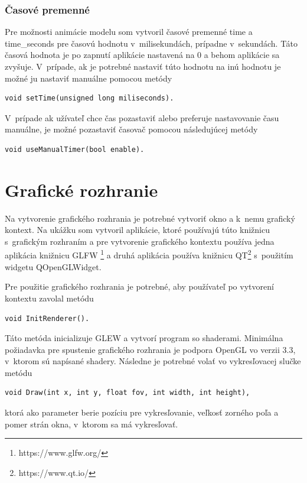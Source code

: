

\subsubsection*{Časové premenné}
Pre možnosti animácie modelu som vytvoril časové premenné time a time\_seconds pre časovú hodnotu v~milisekundách, prípadne v~sekundách. Táto časová hodnota je po zapnutí aplikácie nastavená na 0 a behom aplikácie sa zvyšuje. V~prípade, ak je potrebné nastaviť túto hodnotu na inú hodnotu je možné ju nastaviť manuálne pomocou metódy
\begin{lstlisting}
void setTime(unsigned long miliseconds).
\end{lstlisting}
V~prípade ak užívateľ chce čas pozastaviť alebo preferuje nastavovanie času manuálne, je možné pozastaviť časovač pomocou následujúcej metódy
\begin{lstlisting}
void useManualTimer(bool enable).
\end{lstlisting}

\section{Grafické rozhranie}
Na vytvorenie grafického rozhrania je potrebné vytvoriť okno a k~nemu grafický kontext. Na ukážku som vytvoril aplikácie, ktoré používajú túto knižnicu s~grafickým rozhraním a pre vytvorenie grafického kontextu používa jedna aplikácia knižnicu GLFW \footnote{https://www.glfw.org/} a druhá aplikácia používa knižnicu QT\footnote{https://www.qt.io/} s~použitím widgetu QOpenGLWidget. 

Pre použitie grafického rozhrania je potrebné, aby používateľ po vytvorení kontextu zavolal metódu 
\begin{lstlisting}
void InitRenderer().
\end{lstlisting}
Táto metóda inicializuje GLEW a vytvorí program so shaderami.  Minimálna požiadavka pre spustenie grafického rozhrania je podpora OpenGL vo verzii 3.3, v~ktorom sú napísané shadery.
Následne je potrebné volať vo vykresľovacej slučke metódu  
\begin{lstlisting}
void Draw(int x, int y, float fov, int width, int height),
\end{lstlisting}
ktorá ako parameter berie pozíciu pre vykresľovanie, veľkosť zorného poľa a pomer strán okna, v~ktorom sa má vykresľovať.

